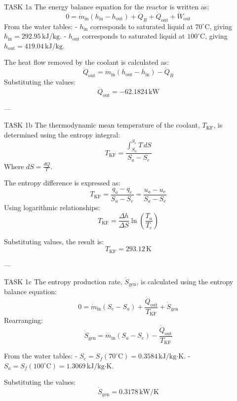 TASK 1a  
The energy balance equation for the reactor is written as:  
\[
0 = \dot{m}_{\text{in}} (h_{\text{in}} - h_{\text{out}}) + \dot{Q}_R + \dot{Q}_{\text{out}} + \dot{W}_{\text{out}}
\]  
From the water tables:  
- \( h_{\text{in}} \) corresponds to saturated liquid at \( 70^\circ\text{C} \), giving \( h_{\text{in}} = 292.95 \, \text{kJ/kg} \).  
- \( h_{\text{out}} \) corresponds to saturated liquid at \( 100^\circ\text{C} \), giving \( h_{\text{out}} = 419.04 \, \text{kJ/kg} \).  

The heat flow removed by the coolant is calculated as:  
\[
\dot{Q}_{\text{out}} = \dot{m}_{\text{in}} (h_{\text{out}} - h_{\text{in}}) - \dot{Q}_R
\]  
Substituting the values:  
\[
\dot{Q}_{\text{out}} = -62.1824 \, \text{kW}
\]  

---

TASK 1b  
The thermodynamic mean temperature of the coolant, \( T_{\text{KF}} \), is determined using the entropy integral:  
\[
T_{\text{KF}} = \frac{\int_{S_a}^{S_e} T \, dS}{S_a - S_e}
\]  
Where \( dS = \frac{dQ}{T} \).  

The entropy difference is expressed as:  
\[
T_{\text{KF}} = \frac{q_a - q_e}{S_a - S_e} = \frac{u_a - u_e}{S_a - S_e}
\]  
Using logarithmic relationships:  
\[
T_{\text{KF}} = \frac{\Delta h}{\Delta S} \ln \left( \frac{T_a}{T_e} \right)
\]  

Substituting values, the result is:  
\[
T_{\text{KF}} = 293.12 \, \text{K}
\]  

---

TASK 1c  
The entropy production rate, \( \dot{S}_{\text{gen}} \), is calculated using the entropy balance equation:  
\[
0 = \dot{m}_{\text{in}} (S_e - S_a) + \frac{\dot{Q}_{\text{out}}}{T_{\text{KF}}} + \dot{S}_{\text{gen}}
\]  
Rearranging:  
\[
\dot{S}_{\text{gen}} = \dot{m}_{\text{in}} (S_a - S_e) - \frac{\dot{Q}_{\text{out}}}{T_{\text{KF}}}
\]  

From the water tables:  
- \( S_e = S_f(70^\circ\text{C}) = 0.3584 \, \text{kJ/kg·K} \).  
- \( S_a = S_f(100^\circ\text{C}) = 1.3069 \, \text{kJ/kg·K} \).  

Substituting the values:  
\[
\dot{S}_{\text{gen}} = 0.3178 \, \text{kW/K}
\]